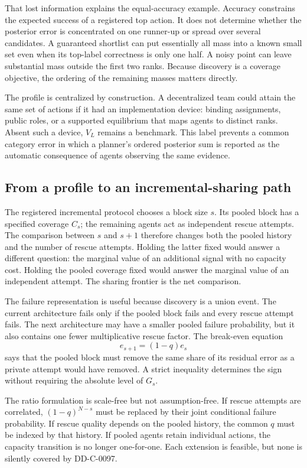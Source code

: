 \documentclass[12pt]{article}
\theoremstyle{definition}
\begin{document}
That lost information explains the equal-accuracy example. Accuracy constrains
the expected success of a registered top action. It does not determine whether
the posterior error is concentrated on one runner-up or spread over several
candidates. A guaranteed shortlist can put essentially all mass into a known
small set even when its top-label correctness is only one half. A noisy point can
leave substantial mass outside the first two ranks. Because discovery is a
coverage objective, the ordering of the remaining masses matters directly.

The profile is centralized by construction. A decentralized team could attain
the same set of actions if it had an implementation device: binding assignments,
public roles, or a supported equilibrium that maps agents to distinct ranks.
Absent such a device, $V_L$ remains a benchmark. This label prevents a common
category error in which a planner's ordered posterior sum is reported as the
automatic consequence of agents observing the same evidence.

\subsection*{From a profile to an incremental-sharing path}

The registered incremental protocol chooses a block size $s$. Its pooled block
has a specified coverage $C_s$; the remaining agents act as independent rescue
attempts. The comparison between $s$ and $s+1$ therefore changes both the pooled
history and the number of rescue attempts. Holding the latter fixed would answer
a different question: the marginal value of an additional signal with no
capacity cost. Holding the pooled coverage fixed would answer the marginal value
of an independent attempt. The sharing frontier is the net comparison.

The failure representation is useful because discovery is a union event. The
current architecture fails only if the pooled block fails and every rescue
attempt fails. The next architecture may have a smaller pooled failure
probability, but it also contains one fewer multiplicative rescue factor. The
break-even equation
\[
 e_{s+1}=(1-q)e_s
\]
says that the pooled block must remove the same share of its residual error as a
private attempt would have removed. A strict inequality determines the sign
without requiring the absolute level of $G_s$.

The ratio formulation is scale-free but not assumption-free. If rescue attempts
are correlated, $(1-q)^{N-s}$ must be replaced by their joint conditional failure
probability. If rescue quality depends on the pooled history, the common $q$
must be indexed by that history. If pooled agents retain individual actions, the
capacity transition is no longer one-for-one. Each extension is feasible, but
none is silently covered by DD-C-0097.
\end{document}
